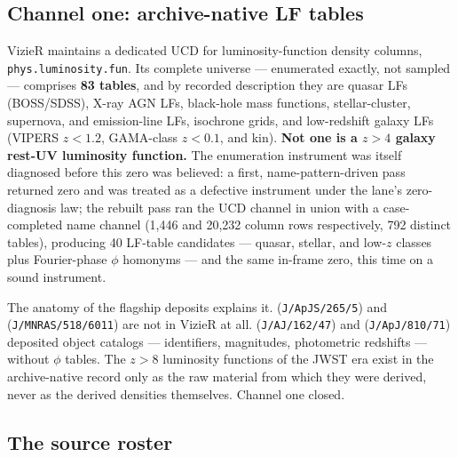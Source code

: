 \documentclass[twocolumn]{aastex702}
\begin{document}
\subsection{Channel one: archive-native LF tables} \label{sec:chan1}

VizieR maintains a dedicated UCD for luminosity-function density columns,
\texttt{phys.luminosity.fun}. Its complete universe --- enumerated exactly, not sampled
--- comprises \textbf{83 tables}, and by recorded description they are quasar LFs
(BOSS/SDSS), X-ray AGN LFs, black-hole mass functions, stellar-cluster, supernova, and
emission-line LFs, isochrone grids, and low-redshift galaxy LFs (VIPERS $z<1.2$,
GAMA-class $z<0.1$, and kin). \textbf{Not one is a $z>4$ galaxy rest-UV luminosity
function.} The enumeration instrument was itself diagnosed before this zero was believed:
a first, name-pattern-driven pass returned zero and was treated as a defective instrument
under the lane's zero-diagnosis law; the rebuilt pass ran the UCD channel in union with a
case-completed name channel (1{,}446 and 20{,}232 column rows respectively, 792 distinct
tables), producing 40 LF-table candidates --- quasar, stellar, and low-$z$ classes plus
Fourier-phase $\phi$ homonyms --- and the same in-frame zero, this time on a sound
instrument.

The anatomy of the flagship deposits explains it. \citet{harikane23}
(\texttt{J/ApJS/265/5}) and \citet{donnan23} (\texttt{J/MNRAS/518/6011}) are not in
VizieR at all. \citet{bouwens21} (\texttt{J/AJ/162/47}) and \citet{finkelstein15}
(\texttt{J/ApJ/810/71}) deposited object catalogs --- identifiers, magnitudes, photometric
redshifts --- without $\phi$ tables. The $z>8$ luminosity functions of the JWST era exist
in the archive-native record only as the raw material from which they were derived, never
as the derived densities themselves. Channel one closed.

\subsection{The source roster} \label{sec:roster}
\end{document}
